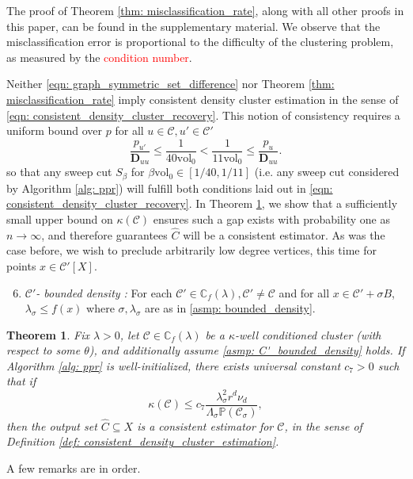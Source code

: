 \documentclass{article}
\newcommand{\vol}{\mathrm{vol}}
\newcommand{\1}{\mathbf{1}}
\newcommand{\pbf}{p}        %
\newcommand{\Xbf}{X}             %
\newcommand{\Dbf}{\mathbf{D}}
\newcommand{\Pbb}{\mathbb{P}}
\newcommand{\Cbb}{\mathbb{C}}
\newcommand{\Cset}{\mathcal{C}}
\newcommand{\Csig}{\Cset_{\sigma}}
\newcommand{\Cest}{\widehat{C}}
\theoremstyle{aldenthm}
\newtheorem{theorem}{Theorem}
\theoremstyle{aldenrmrk}
\begin{document}
The proof of Theorem \ref{thm: misclassification_rate}, along with all other proofs in this paper, can be found in the supplementary material. We observe that the misclassification error is proportional to the difficulty of the clustering problem, as measured by the \textcolor{red}{condition number}.

Neither \eqref{eqn: graph_symmetric_set_difference} nor Theorem \ref{thm: misclassification_rate} imply consistent density cluster estimation in the sense of \eqref{eqn: consistent_density_cluster_recovery}. This notion of consistency requires a uniform bound over $\pbf$ for all $u \in \Cset, u' \in \Cset'$
\begin{equation}
\label{eqn: ppr_gap}
\frac{p_{u'}}{\Dbf_{uu}} \leq \frac{1}{40\vol_0} < \frac{1}{11\vol_0} \leq \frac{p_u}{\Dbf_{uu}}.
\end{equation}
so that any sweep cut $S_{\beta}$ for $\beta \vol_0 \in [1/40,1/11]$ (i.e. any sweep cut considered by Algorithm \ref{alg: ppr}) will fulfill both conditions laid out in \eqref{eqn: consistent_density_cluster_recovery}. In Theorem \ref{thm: consistent_recovery_of_density_clusters}, we show that a sufficiently small upper bound on $\kappa(\Cset)$ ensures such a gap exists with probability one as $n \to \infty$, and therefore guarantees $\Cest$ will be a consistent estimator. As was the case before, we wish to preclude arbitrarily low degree vertices, this time for points $x \in \Cset'[\Xbf]$.
\begin{enumerate}[label=(A\arabic*)]
	\setcounter{enumi}{5}
	\item 
	\label{asmp: C'_bounded_density}
	\emph{$\Cset'$- bounded density :} For each $\Cset' \in \Cbb_f(\lambda), \Cset' \neq \Cset$ and for all $x \in \Cset' + \sigma B$, $\lambda_{\sigma} \leq f(x)$ where $\sigma,\lambda_{\sigma}$ are as in \ref{asmp: bounded_density}.
\end{enumerate}

\begin{theorem}
	\label{thm: consistent_recovery_of_density_clusters}
	Fix $\lambda > 0$, let $\Cset \in \Cbb_f(\lambda)$ be a $\kappa$-well conditioned cluster (with respect to some $\theta$), and additionally assume \ref{asmp: C'_bounded_density} holds. If Algorithm \ref{alg: ppr} is well-initialized, there exists universal constant $c_7 > 0$ such that if
	\begin{equation}
	\label{eqn: kappa_ub}
	\kappa(\Cset) \leq c_7 \frac{\lambda_{\sigma}^2r^d \nu_d}{\Lambda_{\sigma}\Pbb(\Csig)},
	\end{equation}
	then the output set $\Cest \subseteq \Xbf$ is a consistent estimator for $\Cset$, in the sense of Definition \ref{def: consistent_density_cluster_estimation}.
\end{theorem}
A few remarks are in order.
\end{document}
